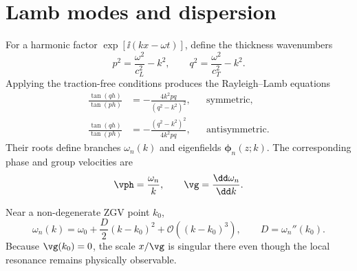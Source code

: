 \section{Lamb modes and dispersion}

For a harmonic factor $\exp[\ii(kx-\omega t)]$, define the thickness
wavenumbers
\begin{equation}
  p^2=\frac{\omega^2}{c_L^2}-k^2,
  \qquad
  q^2=\frac{\omega^2}{c_T^2}-k^2.
\end{equation}
Applying the traction-free conditions produces the Rayleigh--Lamb equations
\begin{align}
 \frac{\tan(qh)}{\tan(ph)}
 &=-\frac{4k^2pq}{(q^2-k^2)^2}, &&\text{symmetric},\\
 \frac{\tan(qh)}{\tan(ph)}
 &=-\frac{(q^2-k^2)^2}{4k^2pq}, &&\text{antisymmetric}.
\end{align}
Their roots define branches $\omega_n(k)$ and eigenfields $\bm\phi_n(z;k)$.
The corresponding phase and group velocities are
\begin{equation}
  \vph=\frac{\omega_n}{k},\qquad
  \vg=\frac{\dd\omega_n}{\dd k}.
\end{equation}

Near a non-degenerate ZGV point $k_0$,
\begin{equation}
  \omega_n(k)=\omega_0+\frac{D}{2}(k-k_0)^2
  +\mathcal O\!\left((k-k_0)^3\right),
  \qquad D=\omega_n''(k_0).
  \label{eq:zgv-expansion}
\end{equation}
Because $\vg(k_0)=0$, the scale $x/\vg$ is singular there even though the local
resonance remains physically observable.
